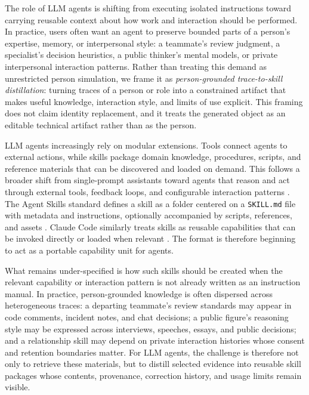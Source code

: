 \documentclass{article}
\begin{document}
The role of LLM agents is shifting from executing isolated instructions toward carrying reusable context about how work and interaction should be performed. In practice, users often want an agent to preserve bounded parts of a person's expertise, memory, or interpersonal style: a teammate's review judgment, a specialist's decision heuristics, a public thinker's mental models, or private interpersonal interaction patterns. Rather than treating this demand as unrestricted person simulation, we frame it as \emph{person-grounded trace-to-skill distillation}: turning traces of a person or role into a constrained artifact that makes useful knowledge, interaction style, and limits of use explicit. This framing does not claim identity replacement, and it treats the generated object as an editable technical artifact rather than as the person.

LLM agents increasingly rely on modular extensions. Tools connect agents to external actions, while skills package domain knowledge, procedures, scripts, and reference materials that can be discovered and loaded on demand. This follows a broader shift from single-prompt assistants toward agents that reason and act through external tools, feedback loops, and configurable interaction patterns \citep{yaoReAct2023,schickToolformer2023,shinnReflexion2023,wuAutoGen2023}. The Agent Skills standard defines a skill as a folder centered on a \texttt{SKILL.md} file with metadata and instructions, optionally accompanied by scripts, references, and assets \citep{agentskills2026}. Claude Code similarly treats skills as reusable capabilities that can be invoked directly or loaded when relevant \citep{claudeskills2026}. The format is therefore beginning to act as a portable capability unit for agents.

What remains under-specified is how such skills should be created when the relevant capability or interaction pattern is not already written as an instruction manual. In practice, person-grounded knowledge is often dispersed across heterogeneous traces: a departing teammate's review standards may appear in code comments, incident notes, and chat decisions; a public figure's reasoning style may be expressed across interviews, speeches, essays, and public decisions; and a relationship skill may depend on private interaction histories whose consent and retention boundaries matter. For LLM agents, the challenge is therefore not only to retrieve these materials, but to distill selected evidence into reusable skill packages whose contents, provenance, correction history, and usage limits remain visible.
\end{document}
